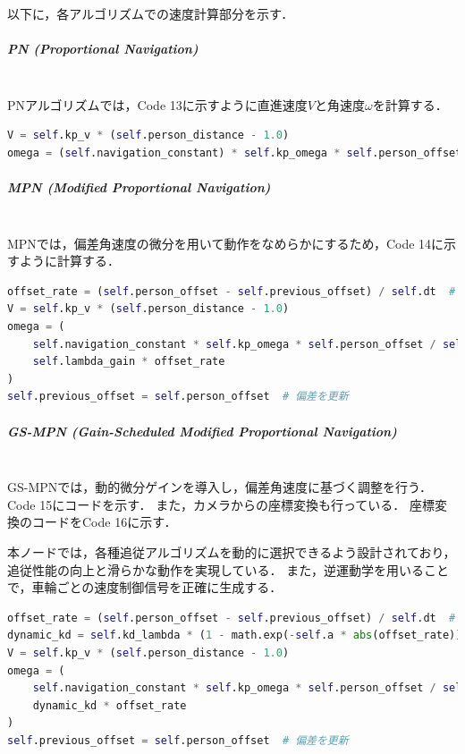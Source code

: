 以下に，各アルゴリズムでの速度計算部分を示す．

\subparagraph{PN (Proportional Navigation)}\mbox{}\\
PNアルゴリズムでは，Code 13に示すように直進速度$V$と角速度$\omega$を計算する．
\begin{lstlisting}[language=Python, caption=PNの計算部分 (Roboware\_node\_np.py)]
V = self.kp_v * (self.person_distance - 1.0)
omega = (self.navigation_constant) * self.kp_omega * self.person_offset / max((self.person_distance), 1.0)
\end{lstlisting}

\subparagraph{MPN (Modified Proportional Navigation)}\mbox{}\\
MPNでは，偏差角速度の微分を用いて動作をなめらかにするため，Code 14に示すように計算する．
\begin{lstlisting}[language=Python, caption=MPNの計算部分 (Roboware\_node\_mpn.py)]
offset_rate = (self.person_offset - self.previous_offset) / self.dt  # 偏差角速度
V = self.kp_v * (self.person_distance - 1.0)
omega = (
    self.navigation_constant * self.kp_omega * self.person_offset / self.person_distance +
    self.lambda_gain * offset_rate
)
self.previous_offset = self.person_offset  # 偏差を更新
\end{lstlisting}

\subparagraph{GS-MPN (Gain-Scheduled Modified Proportional Navigation)}\mbox{}\\
GS-MPNでは，動的微分ゲインを導入し，偏差角速度に基づく調整を行う．
Code 15にコードを示す．
また，カメラからの座標変換も行っている．
座標変換のコードをCode 16に示す．

本ノードでは，各種追従アルゴリズムを動的に選択できるよう設計されており，追従性能の向上と滑らかな動作を実現している．
また，逆運動学を用いることで，車輪ごとの速度制御信号を正確に生成する．

\begin{lstlisting}[language=Python, caption=GS-MPNの計算部分 (Roboware\_node\_newmpn.py)]
offset_rate = (self.person_offset - self.previous_offset) / self.dt  # 偏差角速度
dynamic_kd = self.kd_lambda * (1 - math.exp(-self.a * abs(offset_rate))) / (1 + math.exp(-self.a * abs(offset_rate)))
V = self.kp_v * (self.person_distance - 1.0)
omega = (
    self.navigation_constant * self.kp_omega * self.person_offset / self.person_distance +
    dynamic_kd * offset_rate
)
self.previous_offset = self.person_offset  # 偏差を更新
\end{lstlisting}

